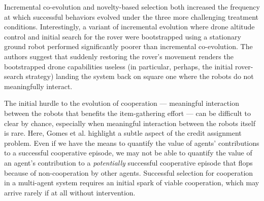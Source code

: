 Incremental co-evolution and novelty-based selection both increased the frequency at which successful behaviors evolved under the three more challenging treatment conditions.
Interestingly, a variant of incremental evolution where drone altitude control and initial search for the rover were bootstrapped using a stationary ground robot performed significantly poorer than incremental co-evolution.
The authors suggest that suddenly restoring the rover's movement renders the bootstrapped drone capabilities useless (in particular, perhaps, the initial rover-search strategy) landing the system back on square one where the robots do not meaningfully interact.

The initial hurdle to the evolution of cooperation --- meaningful interaction between the robots that benefits the item-gathering effort --- can be difficult to clear by chance, especially when meaningful interaction between the robots itself is rare.
Here, Gomes et al. highlight a subtle aspect of the credit assignment problem.
Even if we have the means to quantify the value of agents' contributions to a successful cooperative episode, we may not be able to quantify the value of an agent's contribution to a \textit{potentially} successful cooperative episode that flops because of non-cooperation by other agents.
Successful selection for cooperation in a multi-agent system requires an initial spark of viable cooperation, which may arrive rarely if at all without intervention.
